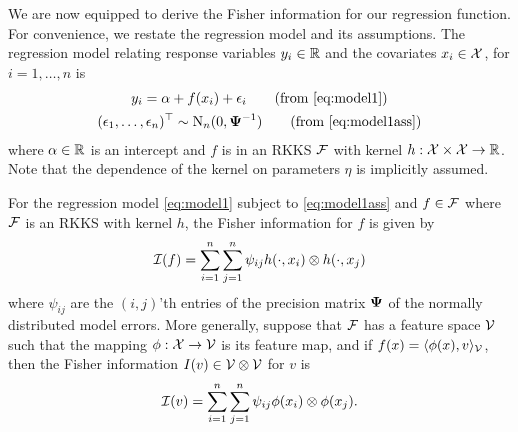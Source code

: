 We are now equipped to derive the Fisher information for our regression function.
For convenience, we restate the regression model and its assumptions.
The regression model relating response variables $y_i \in \mathbb{R}$ and the covariates $x_i \in {\mathcal X} $, for $i=1,\dots,n$ is
\begin{gather}
  y_i = \alpha + f(x_i) + \epsilon_i \retag{eq:model1} \\
  (\epsilon_1, \dots, \epsilon_n)^\top \sim \N_n(0, \bPsi^{-1}) \retag{eq:model1ass}
\end{gather}
where $\alpha \in \mathbb{R}$ is an intercept and $f$ is in an RKKS ${\mathcal F}$ with kernel $h:{\mathcal X} \times {\mathcal X} \to \mathbb{R}$.
Note that the dependence of the kernel on parameters $\eta$ is implicitly assumed.

\begin{lemma}\label{thm:fisherregf}
  For the regression model \cref{eq:model1} subject to \cref{eq:model1ass} and $f \in {\mathcal F}$ where ${\mathcal F}$ is an RKKS with kernel $h$, the Fisher information for $f$ is given by
  \[
    {\mathcal I}(f) = \sum_{i=1}^n\sum_{j=1}^n \psi_{ij} h(\cdot,x_i) \otimes h(\cdot,x_j)
  \]
  where $\psi_{ij}$ are the $(i,j)$'th entries of the precision matrix ${\bm\Psi}$ of the normally distributed model errors.
  More generally, suppose that ${\mathcal F}$ has a feature space ${\mathcal V}$ such that the mapping $\phi:{\mathcal X} \to {\mathcal V}$ is its feature map, and if $f(x)=\langle\phi(x),v\rangle_{\mathcal V}$, then the Fisher information $I(v) \in {\mathcal V} \otimes {\mathcal V}$ for $v$ is
  \[
    {\mathcal I}(v) = \sum_{i=1}^n\sum_{j=1}^n \psi_{ij} \phi(x_i) \otimes \phi(x_j).
  \]
\end{lemma}

